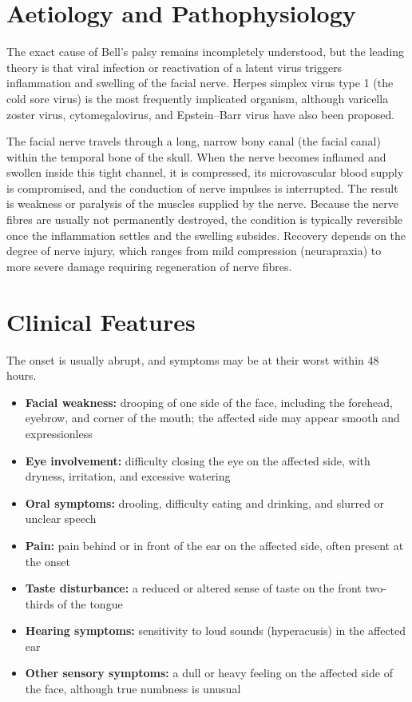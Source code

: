 \section*{Aetiology and Pathophysiology}
The exact cause of Bell's palsy remains incompletely understood, but the leading theory is that viral infection or reactivation of a latent virus triggers inflammation and swelling of the facial nerve. Herpes simplex virus type 1 (the cold sore virus) is the most frequently implicated organism, although varicella zoster virus, cytomegalovirus, and Epstein--Barr virus have also been proposed.

The facial nerve travels through a long, narrow bony canal (the facial canal) within the temporal bone of the skull. When the nerve becomes inflamed and swollen inside this tight channel, it is compressed, its microvascular blood supply is compromised, and the conduction of nerve impulses is interrupted. The result is weakness or paralysis of the muscles supplied by the nerve. Because the nerve fibres are usually not permanently destroyed, the condition is typically reversible once the inflammation settles and the swelling subsides. Recovery depends on the degree of nerve injury, which ranges from mild compression (neurapraxia) to more severe damage requiring regeneration of nerve fibres.

\section*{Clinical Features}
The onset is usually abrupt, and symptoms may be at their worst within 48 hours.

\begin{itemize}
    \item \textbf{Facial weakness:} drooping of one side of the face, including the forehead, eyebrow, and corner of the mouth; the affected side may appear smooth and expressionless
    \item \textbf{Eye involvement:} difficulty closing the eye on the affected side, with dryness, irritation, and excessive watering
    \item \textbf{Oral symptoms:} drooling, difficulty eating and drinking, and slurred or unclear speech
    \item \textbf{Pain:} pain behind or in front of the ear on the affected side, often present at the onset
    \item \textbf{Taste disturbance:} a reduced or altered sense of taste on the front two-thirds of the tongue
    \item \textbf{Hearing symptoms:} sensitivity to loud sounds (hyperacusis) in the affected ear
    \item \textbf{Other sensory symptoms:} a dull or heavy feeling on the affected side of the face, although true numbness is unusual
\end{itemize}

